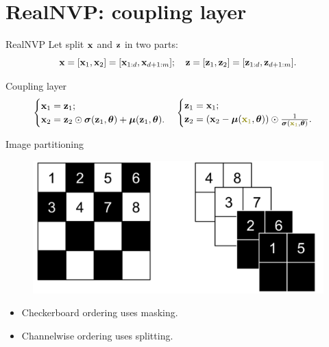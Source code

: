 \section{RealNVP: coupling layer}
\begin{frame}{RealNVP}
	\vspace{-0.5cm}
	Let split $\mathbf{x}$ and $\mathbf{z}$ in two parts: 
	\[
		\mathbf{x} = [\mathbf{x}_1, \mathbf{x}_2] = [\mathbf{x}_{1:d}, \mathbf{x}_{d+1:m}]; \quad \mathbf{z} = [\mathbf{z}_1, \mathbf{z}_2] = [\mathbf{z}_{1:d}, \mathbf{z}_{d+1:m}].
	\]
	\vspace{-0.7cm}
	\begin{block}{Coupling layer}
		\vspace{-0.7cm}
		\[
			\begin{cases} \bx_1 = \bz_1; \\ \bx_2 = \bz_2 \odot \bsigma(\bz_1, \btheta) + \bmu(\bz_1, \btheta).\end{cases}  
			\begin{cases} \bz_1 = \bx_1; \\ \bz_2 = \left(\bx_2 - \bmu({\color{olive}\bx_1}, \btheta) \right) \odot \frac{1}{\bsigma({\color{olive}\bx_1}, \btheta)}.\end{cases}
		\]
	\end{block}
	\vspace{-0.5cm}
	\begin{block}{Image partitioning}
		
		\begin{minipage}[t]{0.5\columnwidth}
			\begin{figure}
				\centering
				\includegraphics[width=\linewidth]{figs/realnvp_masking.png}
			\end{figure}
		\end{minipage}%
		\begin{minipage}[t]{0.5\columnwidth}
			\begin{itemize}
				\item Checkerboard ordering uses masking.
				\item Channelwise ordering uses splitting.
			\end{itemize}
		\end{minipage}
	\end{block}
	\vspace{-0.5cm}
\end{frame}
